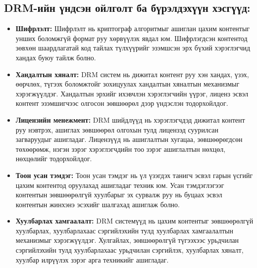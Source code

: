 \subsection{DRM-ийн үндсэн ойлголт ба бүрэлдэхүүн хэсгүүд:}
\begin{itemize}
   \item \textbf{Шифрлэлт:} Шифрлэлт нь криптограф алгоритмыг ашиглан цахим контентыг унших боломжгүй формат руу хөрвүүлэх явдал юм. Шифрлэгдсэн контентод зөвхөн шаардлагатай код тайлах түлхүүрийг эзэмшсэн эрх бүхий хэрэглэгчид хандах буюу тайлж болно.

    \item \textbf{Хандалтын хяналт:} DRM систем нь дижитал контент руу хэн хандах, үзэх, өөрчлөх, түгээх боломжтойг зохицуулах хандалтын хяналтын механизмыг хэрэгжүүлдэг. Хандалтын эрхийг ихэвчлэн хэрэглэгчийн үүрэг, лиценз эсвэл контент эзэмшигчээс олгосон зөвшөөрөл дээр үндэслэн тодорхойлдог.

    \item \textbf{Лицензийн менежмент:} DRM шийдлүүд нь хэрэглэгчдэд дижитал контент руу нэвтрэх, ашиглах зөвшөөрөл олгохын тулд лицензэд суурилсан загваруудыг ашигладаг. Лицензүүд нь ашиглалтын хугацаа, зөвшөөрөгдсөн төхөөрөмж, нэгэн зэрэг хэрэглэгчдийн тоо зэрэг ашиглалтын нөхцөл, нөхцөлийг тодорхойлдог.

    \item \textbf{Тоон усан тэмдэг:} Тоон усан тэмдэг нь үл үзэгдэх танигч эсвэл гарын үсгийг цахим контентод  оруулахад ашигладаг техник юм. Усан тэмдэглэгээг контентын зөвшөөрөлгүй хуулбарыг эх сурвалж руу нь буцаах эсвэл контентын жинхэнэ эсэхийг шалгахад ашиглаж болно.

    \item \textbf{Хуулбарлах хамгаалалт:} DRM системүүд нь цахим контентыг зөвшөөрөлгүй хуулбарлах, хуулбарлахаас сэргийлэхийн тулд хуулбарлах хамгаалалтын механизмыг хэрэгжүүлдэг. Хулгайлах, зөвшөөрөлгүй түгээхээс урьдчилан сэргийлэхийн тулд хуулбарлахаас урьдчилан сэргийлэх, хуулбарлах хяналт, хуулбар илрүүлэх зэрэг арга техникийг ашигладаг.
\end{itemize}
